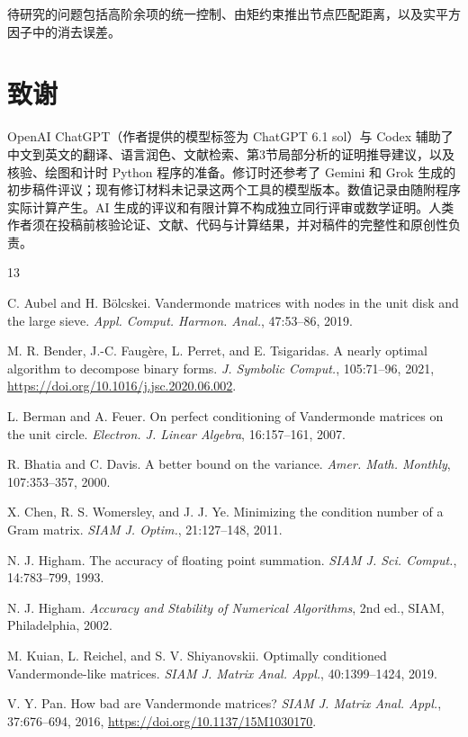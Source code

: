 \documentclass[UTF8,a4paper,zihao=-4,fontset=windows]{ctexart}
\theoremstyle{chinese}
\numberwithin{equation}{section}
\begin{document}
待研究的问题包括高阶余项的统一控制、由矩约束推出节点匹配距离，以及实平方因子中的消去误差。

\section*{致谢}
OpenAI ChatGPT（作者提供的模型标签为 ChatGPT 6.1 sol）与 Codex 辅助了中文到英文的翻译、语言润色、文献检索、第3节局部分析的证明推导建议，以及核验、绘图和计时 Python 程序的准备。修订时还参考了 Gemini 和 Grok 生成的初步稿件评议；现有修订材料未记录这两个工具的模型版本。数值记录由随附程序实际计算产生。AI 生成的评议和有限计算不构成独立同行评审或数学证明。人类作者须在投稿前核验论证、文献、代码与计算结果，并对稿件的完整性和原创性负责。

\begingroup\footnotesize\linespread{1.0}\selectfont
\begin{thebibliography}{13}

C. Aubel and H. B\"olcskei.
Vandermonde matrices with nodes in the
unit disk and the large sieve.
\emph{Appl. Comput. Harmon. Anal.}, 47:53--86, 2019.

M. R. Bender, J.-C. Faug\`ere, L. Perret, and E. Tsigaridas.
A nearly optimal algorithm to decompose binary forms.
\emph{J. Symbolic Comput.}, 105:71--96, 2021, \url{https://doi.org/10.1016/j.jsc.2020.06.002}.

L. Berman and A. Feuer.
On perfect conditioning of Vandermonde
matrices on the unit circle.
\emph{Electron. J. Linear Algebra}, 16:157--161, 2007.

R. Bhatia and C. Davis.
A better bound on the variance.
\emph{Amer. Math. Monthly}, 107:353--357, 2000.

X. Chen, R. S. Womersley, and J. J. Ye.
Minimizing the condition
number of a Gram matrix.
\emph{SIAM J. Optim.}, 21:127--148, 2011.

N. J. Higham.
The accuracy of floating point summation.
\emph{SIAM J. Sci. Comput.}, 14:783--799, 1993.

N. J. Higham.
\emph{Accuracy and Stability of Numerical Algorithms},
2nd ed., SIAM, Philadelphia, 2002.

M. Kuian, L. Reichel, and S. V. Shiyanovskii.
Optimally conditioned
Vandermonde-like matrices.
\emph{SIAM J. Matrix Anal. Appl.}, 40:1399--1424, 2019.

V. Y. Pan.
How bad are Vandermonde matrices?
\emph{SIAM J. Matrix
Anal. Appl.}, 37:676--694, 2016, \url{https://doi.org/10.1137/15M1030170}.


\end{thebibliography}
\end{document}
